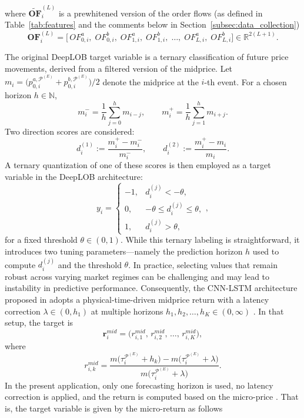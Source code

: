\documentclass[10pt,a4paper,oneside]{article}
\begin{document}
where $\widetilde{\mathbf{OF}}^{(L)}_i$ is a prewhitened version of the order flows (as defined in Table~\ref{tab:features} and the comments below in Section~\ref{subsec:data_collection})
\[
    \mathbf{OF}^{(L)}_i
    =
    \bigl[\,OF^a_{0, i},\;
        OF^b_{0, i},\; OF^a_{1, i},\; OF^b_{1, i},\; \dots,\; OF^a_{L, i},\; OF^b_{L, i}\bigr]
    \in \mathbb{R}^{2(L + 1)}.
\]

The original DeepLOB target variable is a ternary classification of future price movements, derived from a filtered version of the midprice. Let $m_i = \bigl(p^{a, \mathcal{P}^{(E)}}_{0,i} + p^{b, \mathcal{P}^{(E)}}_{0,i}\bigr) / 2$ denote the midprice at the $i$-th event. For a chosen horizon $h \in \mathbb{N}$,
\[
    m_i^- = \frac{1}{h}\sum_{j=0}^{h} m_{i-j},
    \quad\quad
    m_i^+ = \frac{1}{h}\sum_{j=1}^{h} m_{i+j}.
\]
Two direction scores are considered:
\[
    d_i^{(1)} := \frac{m_i^+ - m_i^-}{m_i^-},
    \quad\quad
    d_i^{(2)} := \frac{m_i^+ - m_i}{m_i}.
\]
A ternary quantization of one of these scores is then employed as a target variable in the DeepLOB architecture:
\[
    y_i =
    \begin{cases}
        -1, & d_i^{(j)} < -\theta,              \\[6pt]
        0,  & -\theta \le d_i^{(j)} \le \theta, \\[6pt]
        1,  & d_i^{(j)} > \theta,
    \end{cases},
\]
for a fixed threshold \(\theta \in (0, 1)\). While this ternary labeling is straightforward, it introduces two tuning parameters—namely the prediction horizon \(h\) used to compute \(d_i^{(j)}\) and the threshold \(\theta\). In practice, selecting values that remain robust across varying market regimes can be challenging and may lead to instability in predictive performance. Consequently, the CNN-LSTM architecture proposed in \cite{kolm2023deep} adopts a physical-time-driven midprice return with a latency correction \(\lambda \in (0, h_1)\) at multiple horizons \(h_1, h_2, \dots, h_K \in (0, \infty)\) . In that setup, the target is
\[
    \mathbf{r}^{mid}_i
    =
    \bigl(r^{mid}_{i, 1},\, r^{mid}_{i, 2},\, \dots,\, r^{mid}_{i, K}\bigr),
\]
where
\[
    r^{mid}_{i, k}
    =
    \frac{m\bigl(\tau^{\mathcal{P}^{(E)}}_i + h_k\bigr)
        - m\bigl(\tau^{\mathcal{P}^{(E)}}_i + \lambda\bigr)}{m\bigl(\tau^{\mathcal{P}^{(E)}}_i + \lambda\bigr)}.
\]
In the present application, only one forecasting horizon is used, no latency correction is applied, and the return is computed based on the micro-price \cite{gatheral2010zero}. That is, the target variable is given by the micro-return as follows
\end{document}
